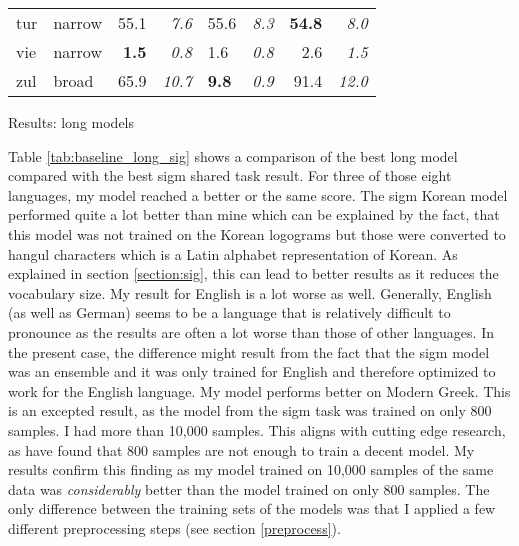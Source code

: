 {\begin{tabularx}{\textwidth}{|l|X||r|r||X|X||r|r|}
tur       & narrow        & 55.1         & \textit{7.6}    & 55.6         & \textit{8.3}          & \textbf{54.8}   & \textit{8.0}    \\
vie       & narrow        & \textbf{1.5} & \textit{0.8}    & 1.6          & \textit{0.8}          & 2.6    & \textit{1.5}    \\
zul       & broad         & 65.9         & \textit{10.7}   & \textbf{9.8}          & \textit{0.9}          & 91.4   & \textit{12.0}   \\ \hline
\end{tabularx}
}{Results: long models}

Table \ref{tab:baseline_long_sig} shows a comparison of the best long model compared with the best \ac{sigm} shared task result. For three of those eight languages, my model reached a better or the same score. The \ac{sigm} Korean model performed quite a lot better than mine which can be explained by the fact, that this model was not trained on the Korean logograms but those were converted to hangul characters which is a Latin alphabet representation of Korean. As explained in section \ref{section:sig}, this can lead to better results as it reduces the vocabulary size. My result for English is a lot worse as well. Generally, English (as well as German) seems to be a language that is relatively difficult to pronounce as the results are often a lot worse than those of other languages. In the present case, the difference might result from the fact that the \ac{sigm} model was an ensemble and it was only trained for English and therefore optimized to work for the English language. My model performs better on Modern Greek. This is an excepted result, as the model from the \ac{sigm} task was trained on only 800 samples. I had more than 10,000 samples. This aligns with cutting edge research, as \citet{Ashby-Bartley.2021} have found that 800 samples are not enough to train a decent model. My results confirm this finding as my model trained on 10,000 samples of the same data was \textit{considerably} better than the model trained on only 800 samples. The only difference between the training sets of the models was that I applied a few different preprocessing steps (see section \ref{preprocess}). 

